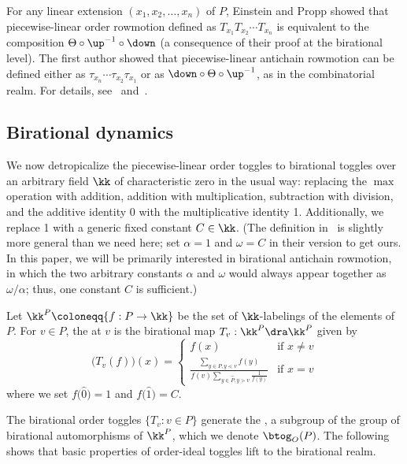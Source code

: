 For any linear extension $(x_1,x_2,\dots,x_n)$ of $P$,
Einstein and Propp showed that piecewise-linear order rowmotion
defined as $T_{x_1}T_{x_2}\cdots T_{x_n}$
is equivalent to the composition $\Theta \circ \up^{-1} \circ \down$ (a consequence of
their proof at the birational level). 
The first author showed that piecewise-linear antichain rowmotion can be defined either as
$\tau_{x_n}\cdots \tau_{x_2}\tau_{x_1}$ or as
$\down\circ\Theta \circ \up^{-1}$, as in the combinatorial realm.
For details, see~\cite[\S~4, \S~6]{einpropp} and~\cite[\S~3.3, \S~3.4]{antichain-toggling}.


\subsection{Birational dynamics}

We now detropicalize the piecewise-linear order toggles to birational
toggles over an arbitrary field $\kk$ of characteristic zero in the usual way: replacing
the $\max$ operation with addition, 
addition with multiplication, 
subtraction with division, and
the additive identity 0 with the multiplicative identity 1.
Additionally, we replace 1 with a generic fixed constant $C\in\kk$.
(The definition
in~\cite{einpropp} is slightly more general than we need here; set $\alpha=1$ and
$\omega=C$ in their version to get ours. In this paper, we will be primarily interested in
birational antichain rowmotion, in which the two arbitrary constants $\alpha$ and $\omega$
would always appear together as $\omega/\alpha$; thus, one constant $C$ is sufficient.) 

\begin{defi}
Let $\kk^P\coloneqq \{f:P\rightarrow \kk \}$ be the set of $\kk$-labelings of the elements of $P$.
For $v\in P$, the  at $v$ is the
birational map
$T_v: \kk^P \dra \kk^P$ given by
\[
 \big(T_v(f)\big)(x) =
\begin{cases}
f(x) &\text{if }x\not=v\\[4pt]
\frac{\sum\limits_{y\in\widehat{P},y\lessdot v} f(y)}
{f(v) \sum\limits_{y\in\widehat{P},y\gtrdot v} \frac{1}{f(y)}}
&\text{if }x=v\end{cases}
\]
where we set $f\big(\widehat{0}\big)=1$ and $f\big(\widehat{1}\big)=C$.
\end{defi}
The birational order toggles $\{T_v: v\in P\}$
generate the , a subgroup of the group of
birational automorphisms of $\kk^{P}$, which we denote $\btog_O(P)$.
The following shows that basic properties of order-ideal toggles lift to the birational realm.

